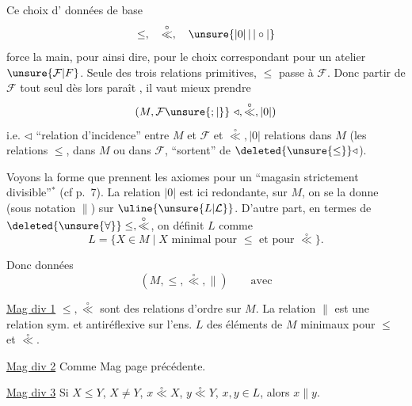 
Ce choix d' données de base
\[
\leq,\quad\overset{\circ}{\ll},\quad\unsure{|0|\,|\,|\circ|}
\]
force la main, pour ainsi dire, pour le choix correspondant pour  un atelier $\unsure{\mathcal F|F}$. Seule des trois relations primitives, $\leq$ passe à $\mathcal F$. Donc partir de $\mathcal F$ tout seul dès lors paraît , il vaut mieux prendre 
\[
(M,\mathcal F\unsure{;|\}}\ \triangleleft,\overset{\circ}{\ll},|0|)
\]
i.e. $\triangleleft$ ``relation d'incidence'' entre $M$ et $\mathcal F$ et $\overset{\circ}{\ll},|0|$ relations dans $M$ (les relations $\leq$, dans $M$ ou dans $\mathcal F$, ``sortent'' de $\deleted{\unsure{\leq}}\triangleleft$).

Voyons la forme que prennent les  axiomes pour un ``magasin strictement divisible''$^\ast$ (cf p.~7). La relation $|0|$ est ici redondante,  sur $M$, on se la donne (sous notation $\parallel$) sur $\uline{\unsure{L|\mathcal L}}$. D'autre part, en termes de $\deleted{\unsure{\forall}}\leq,\overset{\circ}{\ll}$, on définit $L$ comme
\[
L=\{X\in M\mid X\text{ minimal pour }\leq\text{ et pour }\overset{\circ}{\ll}\}.
\]

Donc données
\[
(M,\leq,\overset{\circ}{\ll},\parallel)\qquad\text{avec}
\]

\uline{Mag div 1} $\leq,\overset{\circ}{\ll}$ sont des relations d'ordre sur $M$. La relation $\parallel$ est une relation sym. et antiréflexive sur l'ens. $L$ des éléments de $M$ minimaux pour $\leq$ et $\overset{\circ}{\ll}$.

\uline{Mag div 2} Comme Mag  page précédente.

\uline{Mag div 3} Si $X\leq Y$, $X\neq Y$, $x\overset{\circ}{\ll}X$, $y\overset{\circ}{\ll}Y$, $x,y\in L$, alors $x\parallel y$. 
